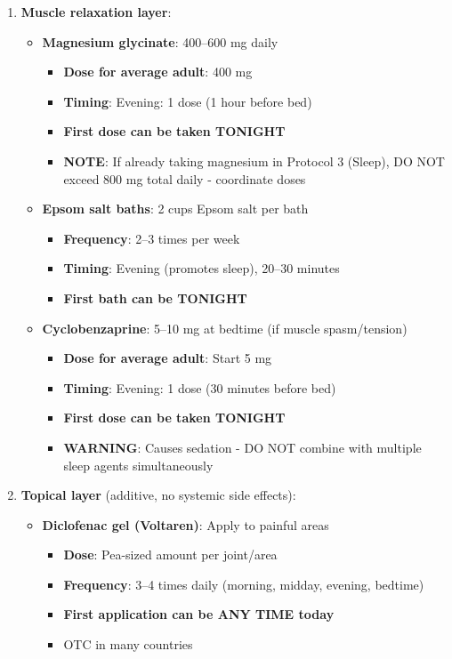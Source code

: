 \begin{enumerate}
    \item \textbf{Muscle relaxation layer}:
    \begin{itemize}
        \item \textbf{Magnesium glycinate}: 400--600 mg daily
        \begin{itemize}
            \item \textbf{Dose for average adult}: 400 mg
            \item \textbf{Timing}: Evening: 1 dose (1 hour before bed)
            \item \textbf{First dose can be taken TONIGHT}
            \item \textbf{NOTE}: If already taking magnesium in Protocol 3 (Sleep), DO NOT exceed 800 mg total daily - coordinate doses
        \end{itemize}

        \item \textbf{Epsom salt baths}: 2 cups Epsom salt per bath
        \begin{itemize}
            \item \textbf{Frequency}: 2--3 times per week
            \item \textbf{Timing}: Evening (promotes sleep), 20--30 minutes
            \item \textbf{First bath can be TONIGHT}
        \end{itemize}

        \item \textbf{Cyclobenzaprine}: 5--10 mg at bedtime (if muscle spasm/tension)
        \begin{itemize}
            \item \textbf{Dose for average adult}: Start 5 mg
            \item \textbf{Timing}: Evening: 1 dose (30 minutes before bed)
            \item \textbf{First dose can be taken TONIGHT}
            \item \textbf{WARNING}: Causes sedation - DO NOT combine with multiple sleep agents simultaneously
        \end{itemize}
    \end{itemize}

    \item \textbf{Topical layer} (additive, no systemic side effects):
    \begin{itemize}
        \item \textbf{Diclofenac gel (Voltaren)}: Apply to painful areas
        \begin{itemize}
            \item \textbf{Dose}: Pea-sized amount per joint/area
            \item \textbf{Frequency}: 3--4 times daily (morning, midday, evening, bedtime)
            \item \textbf{First application can be ANY TIME today}
            \item OTC in many countries
        \end{itemize}


\end{itemize}
\end{enumerate}
